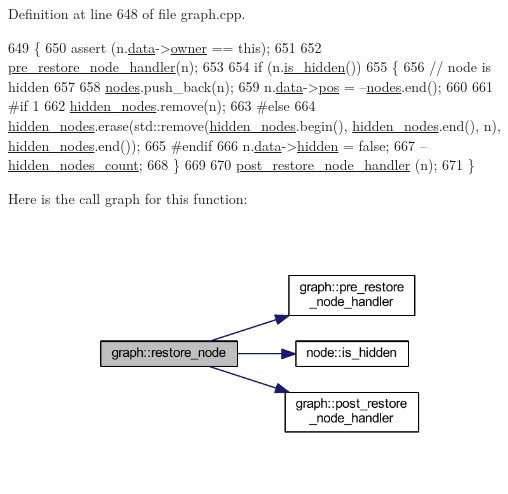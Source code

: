 Definition at line 648 of file graph.\+cpp.


\begin{DoxyCode}
649 \{
650     assert (n.\mbox{\hyperlink{classnode_a4ae3d54ebb61be3a102bedf5b91bef75}{data}}->\mbox{\hyperlink{classnode__data_a20acb07c56fa28df6cbdbf3b0a02cb66}{owner}} == \textcolor{keyword}{this});
651 
652     \mbox{\hyperlink{classgraph_a3a305d240ab5237a2adae315b50105a6}{pre\_restore\_node\_handler}}(n);
653 
654     \textcolor{keywordflow}{if} (n.\mbox{\hyperlink{classnode_af948e15fd00a31e67928c9061acda582}{is\_hidden}}())
655     \{
656         \textcolor{comment}{// node is hidden}
657 
658         \mbox{\hyperlink{classgraph_a4ea0592e8eb7c26c5abad24546907726}{nodes}}.push\_back(n);
659         n.\mbox{\hyperlink{classnode_a4ae3d54ebb61be3a102bedf5b91bef75}{data}}->\mbox{\hyperlink{classnode__data_ab3deb00e39c12058e58a99a38507f344}{pos}} = --\mbox{\hyperlink{classgraph_a4ea0592e8eb7c26c5abad24546907726}{nodes}}.end();
660 
661 \textcolor{preprocessor}{#if 1}
662         \mbox{\hyperlink{classgraph_a7a3f2842a409a4b35ca8ef34598df9ca}{hidden\_nodes}}.remove(n);
663 \textcolor{preprocessor}{#else}
664         \mbox{\hyperlink{classgraph_a7a3f2842a409a4b35ca8ef34598df9ca}{hidden\_nodes}}.erase(std::remove(\mbox{\hyperlink{classgraph_a7a3f2842a409a4b35ca8ef34598df9ca}{hidden\_nodes}}.begin(), 
      \mbox{\hyperlink{classgraph_a7a3f2842a409a4b35ca8ef34598df9ca}{hidden\_nodes}}.end(), n), \mbox{\hyperlink{classgraph_a7a3f2842a409a4b35ca8ef34598df9ca}{hidden\_nodes}}.end());
665 \textcolor{preprocessor}{#endif}
666         n.\mbox{\hyperlink{classnode_a4ae3d54ebb61be3a102bedf5b91bef75}{data}}->\mbox{\hyperlink{classnode__data_a0a841a84f5038562908d726392ce1b55}{hidden}} = \textcolor{keyword}{false};
667         --\mbox{\hyperlink{classgraph_aa72548d972d226a69f7f8fb92b363860}{hidden\_nodes\_count}};
668     \}
669 
670     \mbox{\hyperlink{classgraph_a2d555506de6aa30bb981f0b60375762d}{post\_restore\_node\_handler}} (n);
671 \}
\end{DoxyCode}
Here is the call graph for this function\+:
\nopagebreak
\begin{figure}[H]
\begin{center}
\leavevmode
\includegraphics[width=320pt]{classgraph_ab57aab79e649cc275052b7decbdd03ec_cgraph}
\end{center}
\end{figure}
